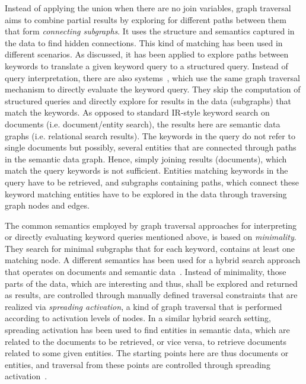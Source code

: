 	Instead of applying the union when there are no join variables, graph traversal aims to combine partial results by exploring for different paths between them that form \emph{connecting subgraphs}. It uses the structure and semantics captured in the data to find hidden connections. This kind of matching has been used in different scenarios. As discussed, it has been applied to explore paths between keywords to translate a given keyword query to a structured query. Instead of query interpretation, there are also systems~\cite{DBLP:conf/cikm/LadwigT11,DBLP:conf/sigmod/LiOFWZ08}, which use the same graph traversal mechanism to directly evaluate the keyword query. They skip the computation of structured queries and directly explore for results in the data (subgraphs) that match the keywords. As opposed to standard IR-style keyword search on documents (i.e. document/entity search), the results here are semantic data graphs (i.e. relational search results). The keywords in the query do not refer to single documents but possibly, several entities that are connected through paths in the semantic data graph. Hence, simply joining results (documents), which match the query keywords is not sufficient. Entities matching keywords in the query have to be retrieved, and subgraphs containing paths, which connect these keyword matching entities have to be explored in the data through traversing graph nodes and edges. 
	
	The common semantics employed by graph traversal approaches for interpreting or directly evaluating keyword queries mentioned above, is based on \emph{minimality}. They search for minimal subgraphs that for each keyword, contains at least one matching node. A different semantics has been used for a hybrid search approach that operates on documents and semantic data~\cite{DBLP:conf/www/RochaSA04}. 
Instead of minimality, those parts of the data, which are interesting and thus, shall be explored and returned as results, are controlled through manually defined traversal constraints that are realized via \emph{spreading activation}, a kind of graph traversal that is performed according to activation levels of nodes. In a similar hybrid search setting, 
spreading activation has been used to find entities in semantic data, which are related to the documents to be retrieved, or vice versa, to retrieve documents related to some given entities. The starting points here are thus documents or entities, and traversal from these points are controlled through spreading activation~\cite{DBLP:conf/esws/SchumacherSS08}.

